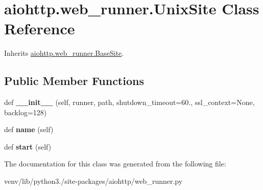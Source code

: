 \hypertarget{classaiohttp_1_1web__runner_1_1_unix_site}{}\section{aiohttp.\+web\+\_\+runner.\+Unix\+Site Class Reference}
\label{classaiohttp_1_1web__runner_1_1_unix_site}


Inherits \hyperlink{classaiohttp_1_1web__runner_1_1_base_site}{aiohttp.\+web\+\_\+runner.\+Base\+Site}.

\subsection*{Public Member Functions}
\begin{DoxyCompactItemize}
\item 
\mbox{\label{classaiohttp_1_1web__runner_1_1_unix_site_a1ad14d248acbf7a7495d2180821a9886}} 
def {\bfseries \+\_\+\+\_\+init\+\_\+\+\_\+} (self, runner, path, shutdown\+\_\+timeout=60., ssl\+\_\+context=None, backlog=128)
\item 
\mbox{\label{classaiohttp_1_1web__runner_1_1_unix_site_adab324250ad16a4a81f19f01f753e4ea}} 
def {\bfseries name} (self)
\item 
\mbox{\label{classaiohttp_1_1web__runner_1_1_unix_site_a8f5f7f579bee3c169fa8fee3fb5c1f3d}} 
def {\bfseries start} (self)
\end{DoxyCompactItemize}


The documentation for this class was generated from the following file\+:\begin{DoxyCompactItemize}
\item 
venv/lib/python3./site-\/packages/aiohttp/web\+\_\+runner.\+py\end{DoxyCompactItemize}
